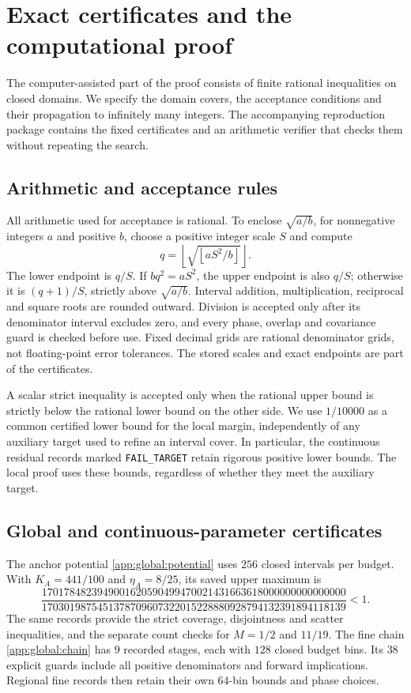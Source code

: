 \section{Exact certificates and the computational proof}\label{app:certificates}
The computer-assisted part of the proof consists of finite rational
inequalities on closed domains. We specify the domain covers, the
acceptance conditions and their propagation to infinitely many integers.
The accompanying reproduction package contains the fixed certificates
and an arithmetic verifier that checks them without repeating the search.

\subsection{Arithmetic and acceptance rules}
All arithmetic used for acceptance is rational. To enclose
$\sqrt{a/b}$, for nonnegative integers $a$ and positive $b$, choose a
positive integer scale $S$ and compute
\[
 q=\left\lfloor\sqrt{\left\lfloor aS^2/b\right\rfloor}\right\rfloor.
\]
The lower endpoint is $q/S$. If $bq^2=aS^2$, the upper endpoint is also
$q/S$; otherwise it is $(q+1)/S$, strictly above $\sqrt{a/b}$.
Interval addition, multiplication,
reciprocal and square roots are rounded outward. Division is accepted
only after its denominator interval excludes zero, and every phase,
overlap and covariance guard is checked before use. Fixed decimal grids
are rational denominator grids, not floating-point error tolerances.
The stored scales and exact endpoints are part of the certificates.

A scalar strict inequality is accepted only when the rational upper
bound is strictly below the rational lower bound on the other side.
We use $1/10000$ as a common certified lower bound for the local margin,
independently of any auxiliary target used to refine an interval cover.
In particular, the continuous residual records marked \texttt{FAIL\_TARGET}
retain rigorous positive lower bounds. The local proof uses these bounds,
regardless of whether they meet the auxiliary target.

\subsection{Global and continuous-parameter certificates}
The anchor potential \eqref{app:global:potential} uses $256$ closed
intervals per budget. With $K_A=441/100$ and $\eta_A=8/25$, its saved
upper maximum is
\[
 \frac{1701784823949001620590499470021431663618000000000000000}
 {1703019875451378709607322015228880928794132391894118139}<1.
\]
The same records provide the strict coverage, disjointness and scatter
inequalities, and the separate count checks for $M=1/2$ and $11/19$.
The fine chain \eqref{app:global:chain} has $9$ recorded stages, each
with $128$ closed budget bins. Its $38$ explicit guards include all
positive denominators and forward implications. Regional fine records
then retain their own $64$-bin bounds and phase choices.

